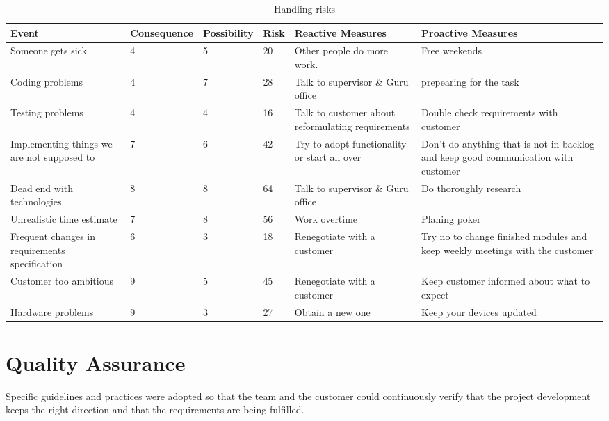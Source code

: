 \documentclass{article}
\newcommand{\ra}[1]{\renewcommand{\arraystretch}{#1}}
\begin{document}
\begin{table*}\centering \ra{1.3}
    \caption{Handling risks}
    \label{tab:risks}
    \vspace{2mm} %
    \begin{sideways}
    \begin{tabularx}{500pt}{XlllXX}
    \toprule
        Event & Consequence & Possibility & Risk  & Reactive Measures & Proactive Measures \\
    \midrule
Someone gets sick & 4     & 5     & 20    & Other people do more work.  & Free weekends \\
Coding problems & 4     & 7     & 28    & Talk to supervisor \& Guru office & prepearing for the task \\
Testing problems & 4     & 4     & 16    & Talk to customer about reformulating requirements & Double check requirements with customer \\
Implementing things we are not supposed to & 7     & 6     & 42    & Try to adopt functionality or start all over & Don't do anything that is not in backlog and keep good communication with customer \\
Dead end with technologies & 8     & 8     & 64    & Talk to supervisor \& Guru office & Do thoroughly research \\
Unrealistic time estimate & 7     & 8     & 56    & Work overtime  & Planing poker \\
Frequent changes in requirements specification & 6     & 3     & 18    & Renegotiate with a customer & Try no to change finished modules and keep weekly meetings with the customer \\
Customer too ambitious & 9     & 5     & 45    & Renegotiate with a customer & Keep customer informed about what  to expect \\
Hardware problems & 9     & 3     & 27    & Obtain a new one & Keep your devices updated \\
    \bottomrule
    \end{tabularx}%
    \end{sideways}
\end{table*}
\section{Quality Assurance}
Specific guidelines and practices were adopted
so that the team and the customer could continuously verify that the project development keeps the right direction and that the requirements are being fulfilled.
\end{document}
